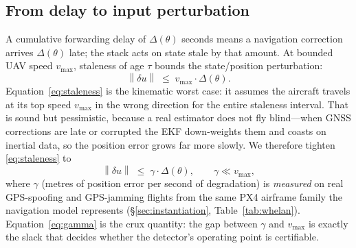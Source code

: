 \documentclass[conference]{IEEEtran}
\newcommand{\Norm}[1]{\left\lVert #1\right\rVert}
\begin{document}
\subsection{From delay to input perturbation}
A cumulative forwarding delay of $\Delta(\theta)$ seconds means a navigation
correction arrives $\Delta(\theta)$ late; the stack acts on state stale by that
amount. At bounded UAV speed $v_{\max}$, staleness of age $\tau$ bounds the
state/position perturbation:
\begin{equation}
\label{eq:staleness}
\Norm{\delta u} \;\le\; v_{\max}\cdot \Delta(\theta).
\end{equation}
Equation~\eqref{eq:staleness} is the kinematic worst case: it assumes the
aircraft travels at its top speed $v_{\max}$ in the wrong direction for the
entire staleness interval. That is sound but pessimistic, because a real
estimator does not fly blind---when GNSS corrections are late or corrupted the
EKF down-weights them and coasts on inertial data, so the position error grows
far more slowly. We therefore tighten \eqref{eq:staleness} to
\begin{equation}
\label{eq:gamma}
\Norm{\delta u}\;\le\;\gamma\cdot\Delta(\theta),\qquad \gamma\ll v_{\max},
\end{equation}
where $\gamma$ (metres of position error per second of degradation) is
\emph{measured} on real GPS-spoofing and GPS-jamming flights from the same PX4
airframe family the navigation model represents (\S\ref{sec:instantiation},
Table~\ref{tab:whelan}). Equation~\eqref{eq:gamma} is the crux quantity: the
gap between $\gamma$ and $v_{\max}$ is exactly the slack that decides whether
the detector's operating point is certifiable.

\end{document}
